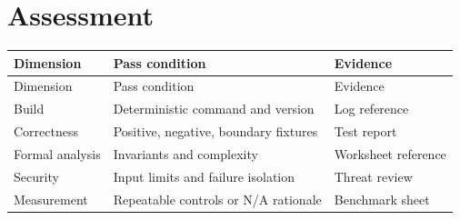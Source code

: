 \documentclass[10pt,letterpaper]{article}
\begin{document}
\section{Assessment}
\begin{longtable}{|>{\raggedright\arraybackslash}p{}|>{\raggedright\arraybackslash}p{}|>{\raggedright\arraybackslash}p{}|}
\hline
Dimension & Pass condition & Evidence\\ \hline\endfirsthead
\hline
Dimension & Pass condition & Evidence\\ \hline\endhead
Build & Deterministic command and version & Log reference\\ \hline
Correctness & Positive, negative, boundary fixtures & Test report\\ \hline
Formal analysis & Invariants and complexity & Worksheet reference\\ \hline
Security & Input limits and failure isolation & Threat review\\ \hline
Measurement & Repeatable controls or N/A rationale & Benchmark sheet\\ \hline
\end{longtable}
\end{document}
